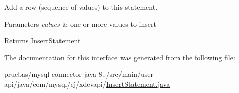Add a row (sequence of values) to this statement.


\begin{DoxyParams}{Parameters}
{\em values} & one or more values to insert \\
\hline
\end{DoxyParams}
\begin{DoxyReturn}{Returns}
\mbox{\hyperlink{interfacecom_1_1mysql_1_1cj_1_1xdevapi_1_1_insert_statement}{Insert\+Statement}} 
\end{DoxyReturn}


The documentation for this interface was generated from the following file\+:\begin{DoxyCompactItemize}
\item 
pruebas/mysql-\/connector-\/java-\/8../src/main/user-\/api/java/com/mysql/cj/xdevapi/\mbox{\hyperlink{_insert_statement_8java}{Insert\+Statement.\+java}}\end{DoxyCompactItemize}

